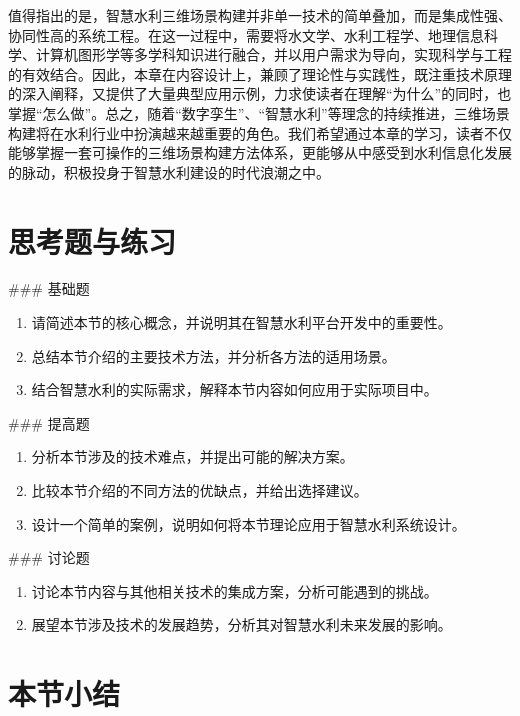 值得指出的是，智慧水利三维场景构建并非单一技术的简单叠加，而是集成性强、协同性高的系统工程。在这一过程中，需要将水文学、水利工程学、地理信息科学、计算机图形学等多学科知识进行融合，并以用户需求为导向，实现科学与工程的有效结合。因此，本章在内容设计上，兼顾了理论性与实践性，既注重技术原理的深入阐释，又提供了大量典型应用示例，力求使读者在理解``为什么''的同时，也掌握``怎么做''。总之，随着``数字孪生''、``智慧水利''等理念的持续推进，三维场景构建将在水利行业中扮演越来越重要的角色。我们希望通过本章的学习，读者不仅能够掌握一套可操作的三维场景构建方法体系，更能够从中感受到水利信息化发展的脉动，积极投身于智慧水利建设的时代浪潮之中。

\section{思考题与练习}

\#\#\# 基础题

\begin{enumerate}
\def\labelenumi{\arabic{enumi}.}
\tightlist
\item
  请简述本节的核心概念，并说明其在智慧水利平台开发中的重要性。
\item
  总结本节介绍的主要技术方法，并分析各方法的适用场景。
\item
  结合智慧水利的实际需求，解释本节内容如何应用于实际项目中。
\end{enumerate}

\#\#\# 提高题

\begin{enumerate}
\def\labelenumi{\arabic{enumi}.}
\setcounter{enumi}{3}
\tightlist
\item
  分析本节涉及的技术难点，并提出可能的解决方案。
\item
  比较本节介绍的不同方法的优缺点，并给出选择建议。
\item
  设计一个简单的案例，说明如何将本节理论应用于智慧水利系统设计。
\end{enumerate}

\#\#\# 讨论题

\begin{enumerate}
\def\labelenumi{\arabic{enumi}.}
\setcounter{enumi}{6}
\tightlist
\item
  讨论本节内容与其他相关技术的集成方案，分析可能遇到的挑战。
\item
  展望本节涉及技术的发展趋势，分析其对智慧水利未来发展的影响。
\end{enumerate}

\section{本节小结}


